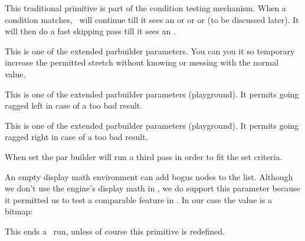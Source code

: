 \stopnewprimitive

\startoldprimitive[title={\prm {else}}]

This traditional primitive is part of the condition testing mechanism. When a
condition matches, \TEX\ will continue till it sees an  or \prm
{or} or  (to be discussed later). It will then do a fast skipping
pass till it sees an .

\stopoldprimitive

\startoldprimitive[title={\prm {emergencyextrastretch}}]

This is one of the extended parbuilder parameters. You can you it so temporary
increase the permitted stretch without knowing or messing with the normal value.

\stopoldprimitive

\startnewprimitive[title={\prm {emergencyleftskip}}]

This is one of the extended parbuilder parameters (playground). It permits going
ragged left in case of a too bad result.

\stopnewprimitive

\startnewprimitive[title={\prm {emergencyrightskip}}]

This is one of the extended parbuilder parameters (playground). It permits going
ragged right in case of a too bad result.

\stopnewprimitive

\startoldprimitive[title={\prm {emergencystretch}}]

When set the par builder will run a third pass in order to fit the set criteria.

\stopoldprimitive

\startnewprimitive[title={\prm {emptyparagraphmode}}]

An empty display math environment can add bogus nodes to the list. Although we
don't use the engine's display math in \CONTEXT, we do support this parameter
because it permitted us to test a comparable feature in \LUATEX. In our case the
value is a bitmap:

\startcolumns[n=2]
\stopcolumns

\stopnewprimitive

\startoldprimitive[title={\prm {end}}]

This ends a \TEX\ run, unless of course this primitive is redefined.

\stopoldprimitive

\startoldprimitive[title={\prm {endcsname}}]

